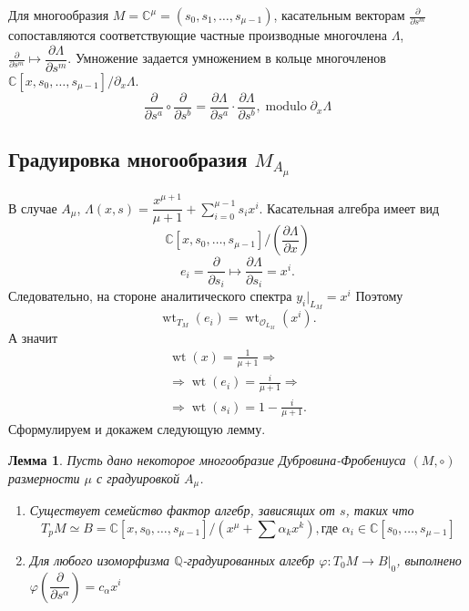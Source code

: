\documentclass[a4paper, 10pt]{article}
\theoremstyle{plain}
\newtheorem{lem}{Лемма}
\newcommand{\tang}[1][\hspace{0pt}]{\frac{\partial }{\partial #1}}
\begin{document}
Для многообразия \(M = \mathbb{C}^{\mu} = (s_0, s_1, \dots, s_{\mu-1})\), касательным векторам \(\tang[s^m]\) сопоставляются соответствующие частные производные многочлена \(\Lambda\), \(\tang[s^m] \mapsto	\dfrac{\partial\Lambda}{\partial s^m}\). Умножение задается умножением в кольце многочленов \(\mathbb{C}[x, s_0, \dots, s_{\mu-1}]/\partial_x \Lambda\).
\[\tang[s^a]\circ\tang[s^b] = \dfrac{\partial\Lambda}{\partial s^a} \cdot \dfrac{\partial\Lambda}{\partial s^b}, \operatorname{modulo} \partial_x\Lambda\]

\subsection{Градуировка многообразия \(M_{A_\mu}\)}
В случае \(A_\mu\), \(\Lambda(x,s)=\dfrac{x^{\mu+1}}{\mu+1}+\sum_{i=0}^{\mu-1}s_i x^i.\)
Касательная алгебра имеет вид\[\mathbb{C}[x,s_0,\ldots,s_{\mu-1}]\Big/
\left(\frac{\partial\Lambda}{\partial x}\right)\]
\[
e_i=\frac{\partial}{\partial s_i}
\longmapsto
\frac{\partial\Lambda}{\partial s_i}
=
x^i.
\]
Следовательно, на стороне аналитического спектра \(y_i|_{L_M}=x^i\)
Поэтому
\[\operatorname{wt}_{T_M}(e_i)=\operatorname{wt}_{\mathcal O_{L_M}}(x^i).\]
А значит
\begin{equation} \label{grad}
\begin{gathered}
\operatorname{wt}(x)=\frac{1}{\mu+1}\Rightarrow\\
\Rightarrow \operatorname{wt}(e_i)=\frac{i}{\mu+1}\Rightarrow\\
\Rightarrow \operatorname{wt}(s_i)=1-\frac{i}{\mu+1}.
\end{gathered}
\end{equation}
Сформулируем и докажем следующую лемму.
\begin{lem}\label{lem1}
Пусть дано некоторое многообразие Дубровина-Фробениуса \((M, \circ)\) размерности \(\mu\) с градуировкой \(A_\mu\).
\begin{enumerate}
    \item Существует семейство фактор алгебр, зависящих от \(s\), таких что 
    \[T_pM \simeq B = \mathbb{C}[x, s_0, \dots,s_{\mu-1}]/(x^{\mu} + \sum \alpha_k x^k), \text{где } \alpha_i \in \mathbb{C}[s_0, \dots, s_{\mu-1}]\]
    \item Для любого изоморфизма \(\mathbb{Q}\)-градуированных алгебр \(\varphi:T_0M \rightarrow B|_0\), выполнено \(\varphi\left(\dfrac{\partial}{\partial s^\alpha}\right) = c_\alpha x^i\)
\end{enumerate}
\end{lem}
\end{document}
